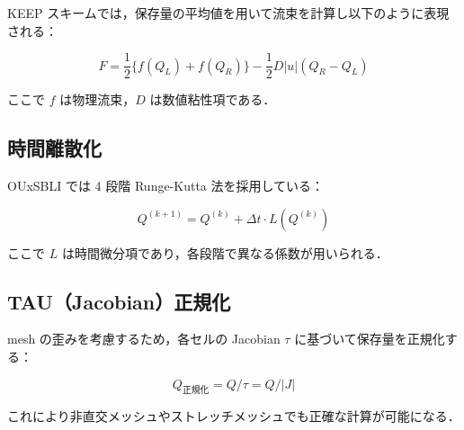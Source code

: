 KEEP スキームでは，保存量の平均値を用いて流束を計算し以下のように表現される：

\begin{equation}
F = \frac{1}{2} \{f(Q_L) + f(Q_R)\} - \frac{1}{2} D |u| (Q_R - Q_L)
\end{equation}

ここで $f$ は物理流束，$D$ は数値粘性項である．

\subsection{時間離散化}

OUxSBLI では 4 段階 Runge-Kutta 法を採用している：

\begin{equation}
Q^{(k+1)} = Q^{(k)} + \Delta t \cdot L(Q^{(k)})
\end{equation}

ここで $L$ は時間微分項であり，各段階で異なる係数が用いられる．

\subsection{TAU（Jacobian）正規化}

mesh の歪みを考慮するため，各セルの Jacobian $\tau$ に基づいて保存量を正規化する：

\begin{equation}
Q_{正規化} = Q / \tau = Q / |J|
\end{equation}

これにより非直交メッシュやストレッチメッシュでも正確な計算が可能になる．
